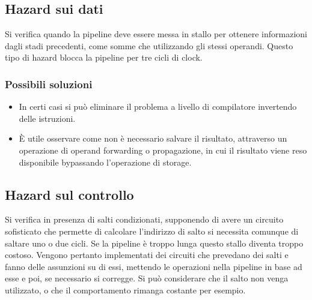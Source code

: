 \subsection{Hazard sui dati}
Si verifica quando la pipeline deve essere messa in stallo per ottenere informazioni dagli stadi precedenti, come somme che utilizzando gli stessi operandi. Questo 
tipo di hazard blocca la pipeline per tre cicli di clock.
\subsubsection{Possibili soluzioni}
\begin{itemize}
\item In certi casi si pu\`o eliminare il problema a livello di compilatore invertendo delle istruzioni.
\item \`E utile osservare come non \`e necessario salvare il risultato, attraverso un operazione di operand forwarding o propagazione, in cui il risultato viene reso 
disponibile bypassando l'operazione di storage.
\end{itemize}
\subsection{Hazard sul controllo}
Si verifica in presenza di salti condizionati, supponendo di avere un circuito sofisticato che permette di calcolare l'indirizzo di salto si necessita comunque di saltare
uno o due cicli. Se la pipeline \`e troppo lunga questo stallo diventa troppo costoso. Vengono pertanto implementati dei circuiti che prevedano dei salti e fanno delle 
assunzioni su di essi, mettendo le operazioni nella pipeline in base ad esse e poi, se necessario si corregge. Si pu\`o considerare che il salto non venga utilizzato, 
o che il comportamento rimanga costante per esempio. 